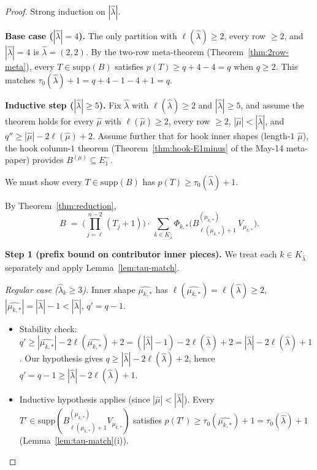\documentclass[11pt]{article}
\theoremstyle{definition}
\newcommand{\hatl}{\widehat\lambda}
\newcommand{\hatm}{\widehat\mu}
\newcommand{\supp}{\mathrm{supp}}
\newcommand{\elh}{\ell(\hatl)}
\begin{document}
\begin{proof}
Strong induction on $|\hatl|$.

\medskip\textbf{Base case ($|\hatl| = 4$).}
The only partition with $\elh \ge 2$, every row $\ge 2$, and $|\hatl|
= 4$ is $\hatl = (2, 2)$.  By the two-row meta-theorem
(Theorem~\ref{thm:2row-meta}), every $T \in \supp(B)$ satisfies
$p(T) \ge q + 4 - 4 = q$ when $q \ge 2$.  This matches
$\tau_0(\hatl) + 1 = q + 4 - 1 - 4 + 1 = q$.

\medskip\textbf{Inductive step ($|\hatl| \ge 5$).}
Fix $\hatl$ with $\elh \ge 2$ and $|\hatl| \ge 5$, and assume the
theorem holds for every $\hatm$ with $\ell(\hatm) \ge 2$, every row
$\ge 2$, $|\hatm| < |\hatl|$, and $q'' \ge |\hatm| - 2\ell(\hatm) + 2$.
Assume further that for hook inner shapes (length-$1$ $\hatm$), the
hook column-$1$ theorem (Theorem~\ref{thm:hook-E1minus} of the May-14
meta-paper) provides $B^{(\mu)} \subseteq E_1^-$.

We must show every $T \in \supp(B)$ has $p(T) \ge \tau_0(\hatl) + 1$.

By Theorem~\ref{thm:reduction},
\[
   B \;=\; \biggl(\prod_{j=\ell}^{n-2}(T_j+1)\biggr)
   \cdot\, \sum_{k \in K_{\hatl}}
   \Phi_{k,*}\bigl(B^{(\mu_{k,*})}_{\ell(\mu_{k,*})+1}\,V_{\mu_{k,*}}\bigr).
\]

\medskip\textbf{Step 1 (prefix bound on contributor inner pieces).}
We treat each $k \in K_{\hatl}$ separately and apply
Lemma~\ref{lem:tau-match}.

\smallskip\emph{Regular case ($\hatl_k \ge 3$).}  Inner shape
$\widehat{\mu_{k,*}}$ has $\ell(\widehat{\mu_{k,*}}) = \elh \ge 2$,
$|\widehat{\mu_{k,*}}| = |\hatl| - 1 < |\hatl|$, $q' = q - 1$.
\begin{itemize}[topsep=0.2em,itemsep=0.1em]
\item Stability check: $q' \ge |\widehat{\mu_{k,*}}| -
   2\ell(\widehat{\mu_{k,*}}) + 2 = (|\hatl| - 1) - 2\elh + 2 =
   |\hatl| - 2\elh + 1$.  Our hypothesis gives $q \ge |\hatl| -
   2\elh + 2$, hence $q' = q - 1 \ge |\hatl| - 2\elh + 1$.\checkmark
\item Inductive hypothesis applies (since $|\hatm| < |\hatl|$).  Every
   $T' \in \supp(B^{(\mu_{k,*})}_{\ell(\mu_{k,*})+1} V_{\mu_{k,*}})$
   satisfies $p(T') \ge \tau_0(\widehat{\mu_{k,*}}) + 1 = \tau_0(\hatl) + 1$
   (Lemma~\ref{lem:tau-match}(i)).
\end{itemize}


\end{proof}
\end{document}

